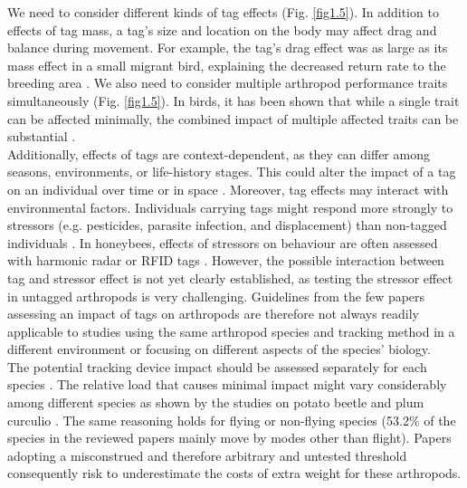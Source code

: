 \documentclass[10pt, twoside]{book} %
\begin{document}
	We need to consider different kinds of tag effects (Fig. \ref{fig1.5}). In addition to effects of tag mass, a tag's size and location on the body may affect drag and balance during movement. For example, the tag's drag effect was as large as its mass effect in a small migrant bird, explaining the decreased return rate to the breeding area \citep{bowlin2010}. We also need to consider multiple arthropod performance traits simultaneously (Fig. \ref{fig1.5}). In birds, it has been shown that while a single trait can be affected minimally, the combined impact of multiple affected traits can be substantial \citep{barron2010, bodey2018}.\\
	
	Additionally, effects of tags are context-dependent, as they can differ among seasons, environments, or life-history stages. This could alter the impact of a tag on an individual over time or in space \citep[e.g. in a passerine:][]{snijders2017}. Moreover, tag effects may interact with environmental factors. Individuals carrying tags might respond more strongly to stressors (e.g. pesticides, parasite infection, and displacement) than non-tagged individuals \citep{desouza2018}. In honeybees, effects of stressors on behaviour are often assessed with harmonic radar \citep[e.g.][]{tison2016} or RFID tags \citep[e.g.][]{lach2015}. However, the possible interaction between tag and stressor effect is not yet clearly established, as testing the stressor effect in untagged arthropods is very challenging. Guidelines from the few papers assessing an impact of tags on arthropods are therefore not always readily applicable to studies using the same arthropod species and tracking method in a different environment or focusing on different aspects of the species' biology.\\
	
	The potential tracking device impact should be assessed separately for each species \citep{gui2011}. The relative load that causes minimal impact might vary considerably among different species as shown by the studies on potato beetle and plum curculio \citep{boiteau2001, boiteau2010}. The same reasoning holds for flying or non-flying species (53.2$\%$ of the species in the reviewed papers mainly move by modes other than flight). Papers adopting a misconstrued and therefore arbitrary and untested threshold consequently risk to underestimate the costs of extra weight for these arthropods.\\
	
\end{document}
